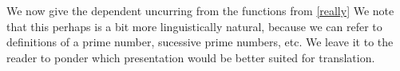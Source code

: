 We now give the dependent uncurring from the functions from \ref{really} We
note that this perhaps is a bit more linguistically natural, because we can
refer to definitions of a prime number, sucessive prime numbers, etc. We leave
it to the reader to ponder which presentation would be better suited for
translation.
\begin{code}%
\>[0]\AgdaSpace{}%
\AgdaSymbol{=}\AgdaSpace{}%
\AgdaFunction{Σ[}\AgdaSpace{}%
\AgdaSpace{}%
\AgdaSpace{}%
\AgdaSpace{}%
\AgdaFunction{]}\AgdaSpace{}%
\AgdaSpace{}%
\<%
\\
%
\\[\AgdaEmptyExtraSkip]%
\>[0]\AgdaSpace{}%
\AgdaSymbol{:}\AgdaSpace{}%
\AgdaSpace{}%
\AgdaSpace{}%
\AgdaSpace{}%
\AgdaSpace{}%
\<%
\\
\>[0]\AgdaSpace{}%
\AgdaSymbol{(}\AgdaSpace{}%
\AgdaOperator{\AgdaInductiveConstructor{,}}\AgdaSpace{}%
\AgdaSymbol{)}\AgdaSpace{}%
\AgdaSymbol{(}\AgdaSpace{}%
\AgdaOperator{\AgdaInductiveConstructor{,}}\AgdaSpace{}%
\AgdaSymbol{)}\AgdaSpace{}%
\AgdaSymbol{=}\<%
\\
\>[0][@{}l@{\AgdaIndent{0}}]%
\>[2]\AgdaSymbol{(}\AgdaBound{(}\AgdaSpace{}%
\AgdaOperator{\AgdaInductiveConstructor{,}}\AgdaSpace{}%
\AgdaBound{)}\AgdaSpace{}%
\AgdaSymbol{:}\AgdaSpace{}%
\AgdaSymbol{)}\AgdaSpace{}%
\<%
\\
%
\>[2]\AgdaSpace{}%
\AgdaSpace{}%
\AgdaSpace{}%
\AgdaSpace{}%
\AgdaSpace{}%
\AgdaSpace{}%
\AgdaSpace{}%
\AgdaSpace{}%
\AgdaSpace{}%
\AgdaSpace{}%
\<%
\\
%
\\[\AgdaEmptyExtraSkip]%
\>[0]\AgdaSpace{}%
\AgdaSymbol{=}\<%
\\
\>[0][@{}l@{\AgdaIndent{0}}]%
\>[2]\AgdaFunction{Σ[}\AgdaSpace{}%
\AgdaSpace{}%
\AgdaSpace{}%
\AgdaSpace{}%
\AgdaFunction{]}\AgdaSpace{}%
\AgdaFunction{Σ[}\AgdaSpace{}%
\AgdaSpace{}%
\AgdaSpace{}%

\end{code}

